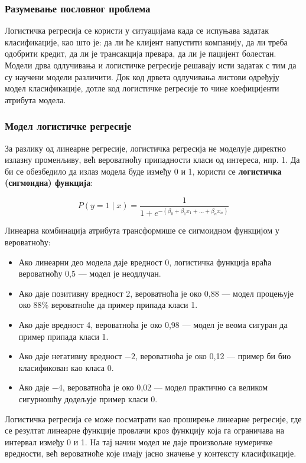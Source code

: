 \subsubsection{Разумевање пословног проблема}
Логистичка регресија се користи у ситуацијама када се испуњава задатак класификације, као што је: да ли ће клијент напустити компанију, да ли треба одобрити кредит, да ли је трансакција превара, да ли је пацијент болестан. Модели дрва одлучивања и логистичке регресије решавају исти задатак с тим да су научени модели различити. Док код дрвета одлучивања листови одређују модел класификације, дотле код логистичке регресије то чине коефицијенти атрибута модела.

\subsubsection{Модел логистичке регресије}
За разлику од линеарне регресије, логистичка регресија не моделује директно излазну променљиву, већ вероватноћу припадности класи од интереса, нпр. 1. Да би се обезбедило да излаз модела буде између 0 и 1, користи се \textbf{логистичка (сигмоидна) функција}:

\[
P(y = 1 \mid x) = \frac{1}{1 + e^{-(\beta_{0} + \beta_{1} x_{1} + \ldots + \beta_{n} x_{n})}}
\]

Линеарна комбинација атрибута трансформише се сигмоидном функцијом у вероватноћу:

\begin{itemize}
  \item Ако линеарни део модела даје вредност 0, логистичка функција враћа вероватноћу 0,5 — модел је неодлучан.
  \item Ако даје позитивну вредност 2, вероватноћа је око 0,88 — модел процењује око 88\% вероватноће да пример припада класи 1.
  \item Ако даје вредност 4, вероватноћа је око 0,98 — модел је веома сигуран да пример припада класи 1.
  \item Ако даје негативну вредност $-2$, вероватноћа је око 0,12 — пример би био класификован као класа 0.
  \item Ако даје $-4$, вероватноћа је око 0,02 — модел практично са великом сигурношћу додељује пример класи 0.
\end{itemize}
Логистичка регресија се може посматрати као проширење линеарне регресије, где се резултат линеарне функције провлачи кроз функцију која га ограничава на интервал између 0 и 1. На тај начин модел не даје произвољне нумеричке вредности, већ вероватноће које имају јасно значење у контексту класификације.

